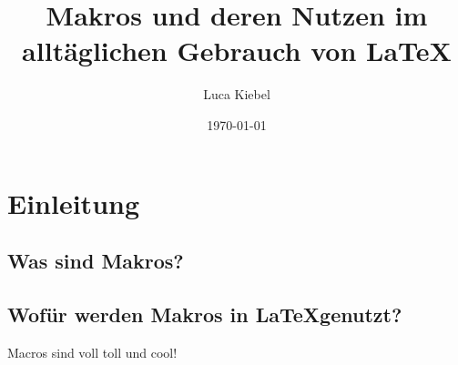 \documentclass[ngerman,12pt,titlepage]{scrartcl}
\title{Makros und deren Nutzen im alltäglichen Gebrauch von \LaTeX}
\author{Luca Kiebel}
\date{\today}
\begin{document}
\maketitle
\newpage
	\tableofcontents
\newpage

\section{Einleitung}
\label{cha:Einleitung}
\subsection{Was sind Makros?}


\subsection{Wofür werden Makros in \LaTeX genutzt?}

Macros sind voll toll und cool!



{}

\end{document}
